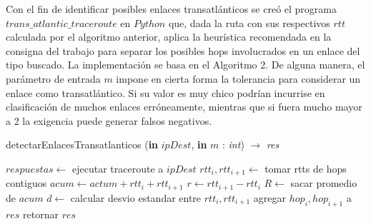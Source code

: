 Con el fin de identificar posibles enlaces transatlánticos se creó el programa $trans\_atlantic\_traceroute$ en $Python$ que, dada la ruta con sus respectivos $rtt$ calculada por el algoritmo anterior, aplica la heurística recomendada en la consigna del trabajo para separar los posibles hops involucrados en un enlace del tipo buscado. La implementación se basa en el Algoritmo 2. De alguna manera, el parámetro de entrada $m$ impone en cierta forma la tolerancia para considerar un enlace como transatlántico. Si su valor es muy chico podrían incurrise en clasificación de muchos enlaces erróneamente, mientras que si fuera mucho mayor a 2 la exigencia puede generar falsos negativos.\\

\begin{algorithm}
\caption{detectarEnlacesTransatlanticos (\textbf{in} $ipDest$, \textbf{in} $m$ : \textsl{int}) $\rightarrow$ \textsl{res}}
\begin{algorithmic}[1]

\STATE $respuestas \leftarrow$ ejecutar traceroute a $ipDest$
	\STATE $rtt_{i}, rtt_{i+1} \leftarrow$ tomar rtts de hops contiguos
	\STATE $acum \leftarrow actum + rtt_{i} + rtt_{i+1}$
	\STATE $r \leftarrow rtt_{i+1} -  rtt_{i}$
	\STATE $R \leftarrow$ sacar promedio de $acum$
	\STATE $d \leftarrow$ calcular desvio estandar entre $rtt_{i}, rtt_{i+1}$ 
		\STATE agregar $hop_{i}, hop_{i+1}$ a $res$
	\ENDIF
\ENDWHILE
\STATE retornar $res$
\end{algorithmic}
\end{algorithm}
